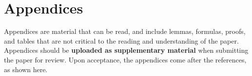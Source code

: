\documentclass[11pt,a4paper]{article}
\begin{document}



\appendix

\section{Appendices}
\label{sec:appendix}
Appendices are material that can be read, and include lemmas, formulas, proofs, and tables that are not critical to the reading and understanding of the paper. 
Appendices should be \textbf{uploaded as supplementary material} when submitting the paper for review.
Upon acceptance, the appendices come after the references, as shown here.
\end{document}

